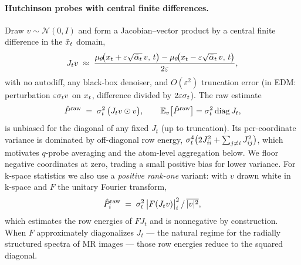\paragraph{Hutchinson probes with central finite differences.}
Draw $v \sim \mathcal{N}(0, I)$ and form a Jacobian--vector product by a
central finite difference in the $\tilde{x}_t$ domain,
\begin{equation}
  J_t v \;\approx\; \frac{\mu_\theta\!\big(x_t + \varepsilon \sqrt{\bar{\alpha}_t}\, v,\, t\big)
  - \mu_\theta\!\big(x_t - \varepsilon \sqrt{\bar{\alpha}_t}\, v,\, t\big)}{2\varepsilon},
  \label{eq:jvp}
\end{equation}
with no autodiff, any black-box denoiser, and $O(\varepsilon^2)$
truncation error (in EDM: perturbation $\varepsilon\sigma_t v$ on $x_t$,
difference divided by $2\varepsilon\sigma_t$). The raw estimate
\begin{equation}
  \hat{P}^{\mathrm{raw}} \;=\; \sigma_t^2 \,\big(J_t v \odot v\big), \qquad
  \mathbb{E}_v\big[\hat{P}^{\mathrm{raw}}\big] = \sigma_t^2 \operatorname{diag} J_t,
  \label{eq:pvest}
\end{equation}
is unbiased for the diagonal of any fixed $J_t$ (up to truncation). Its
per-coordinate variance is dominated by off-diagonal row energy,
$\sigma_t^4\big(2J_{ii}^2 + \sum_{j \neq i} J_{ij}^2\big)$, which motivates
$q$-probe averaging and the atom-level aggregation below. We floor
negative coordinates at zero, trading a small positive bias for lower
variance. For k-space statistics we also use a \emph{positive rank-one}
variant: with $v$ drawn white in k-space and $F$ the unitary Fourier
transform,
\begin{equation}
  \hat{P}^{\mathrm{raw}}_i \;=\; \sigma_t^2\,\big| F (J_t v) \big|_i^2 \,/\, \overline{|v|^2},
  \label{eq:pvk}
\end{equation}
which estimates the row energies of $F J_t$ and is nonnegative by
construction. When $F$ approximately diagonalizes $J_t$ --- the natural
regime for the radially structured spectra of MR images --- those row
energies reduce to the squared diagonal.

